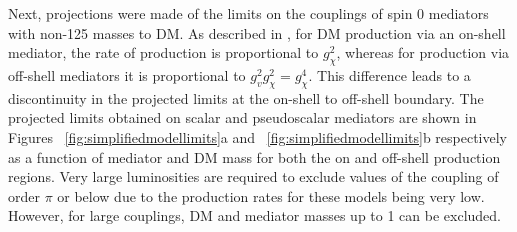 Next, projections were made of the limits on the couplings of spin 0 mediators with non-125 \GeV masses to \ac{DM}. As described in , for \ac{DM} production via an on-shell mediator, the rate of production is proportional to $g_{\chi}^{2}$, whereas for production via off-shell mediators it is proportional to $g_{v}^{2}g_{\chi}^{2}=g_{\chi}^{4}$. This difference leads to a discontinuity in the projected limits at the on-shell to off-shell boundary. The projected limits obtained on scalar and pseudoscalar mediators are shown in Figures ~\ref{fig:simplifiedmodellimits}a and ~\ref{fig:simplifiedmodellimits}b respectively as a function of mediator and \ac{DM} mass for both the on and off-shell production regions. Very large luminosities are required to exclude values of the coupling of order $\pi$ or below due to the production rates for these models being very low. However, for large couplings, \ac{DM} and mediator masses up to 1 \TeV can be excluded.

